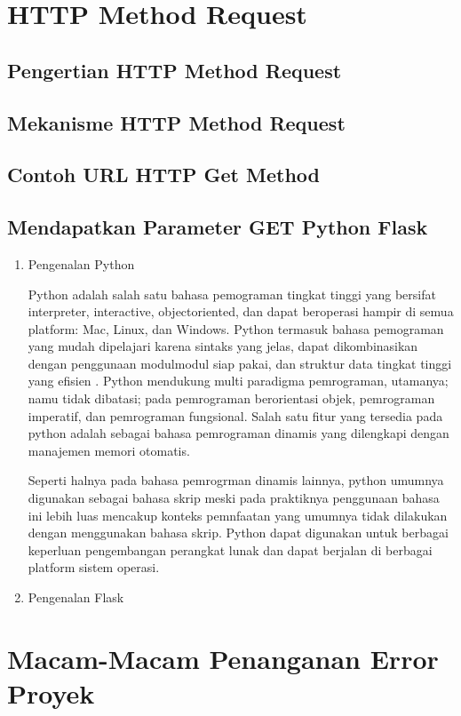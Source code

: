 \section{HTTP Method Request}
\subsection{Pengertian HTTP Method Request}
\subsection {Mekanisme HTTP Method Request}
\subsection {Contoh URL HTTP Get Method}
\subsection {Mendapatkan Parameter GET Python Flask}
    \begin{enumerate}
        \item Pengenalan Python
        
        Python adalah salah satu bahasa pemograman tingkat tinggi yang bersifat interpreter, interactive, objectoriented, dan dapat beroperasi hampir di semua platform: Mac, Linux, dan Windows. Python termasuk bahasa pemograman yang mudah dipelajari karena sintaks yang jelas, dapat dikombinasikan dengan penggunaan modulmodul siap pakai, dan struktur data tingkat tinggi yang efisien \cite{kadir2005dasar}. Python mendukung multi paradigma pemrograman, utamanya; namu tidak dibatasi; pada pemrograman berorientasi objek, pemrograman imperatif, dan pemrograman fungsional. Salah satu fitur yang tersedia pada python adalah sebagai bahasa pemrograman dinamis yang dilengkapi dengan manajemen memori otomatis.
        
        Seperti halnya pada bahasa pemrogrman dinamis lainnya, python umumnya digunakan sebagai bahasa skrip meski pada praktiknya penggunaan bahasa ini lebih luas mencakup konteks pemnfaatan yang umumnya tidak dilakukan dengan menggunakan bahasa skrip. Python dapat digunakan untuk berbagai keperluan pengembangan perangkat lunak dan dapat berjalan di berbagai platform sistem operasi.

        \item Pengenalan Flask
    \end{enumerate}

\section{Macam-Macam Penanganan Error Proyek}

